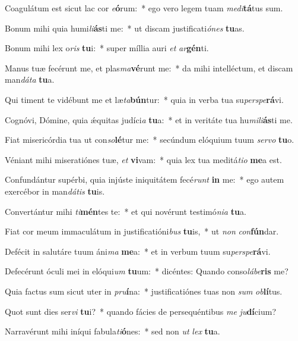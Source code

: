 \item Coagulátum est sicut lac cor \textit{e}\textbf{ó}rum:~* ego vero legem tuam \textit{me}\textit{di}\textbf{tá}tus sum.
\item Bonum mihi quia humi\textit{li}\textbf{ás}ti me:~* ut discam justificati\textit{ó}\textit{nes} \textbf{tu}as.
\item Bonum mihi lex o\textit{ris} \textbf{tu}i:~* super míllia auri \textit{et} \textit{ar}\textbf{gén}ti.
\item Manus tuæ fecérunt me, et plas\textit{ma}\textbf{vé}runt me:~* da mihi intelléctum, et discam man\textit{dá}\textit{ta} \textbf{tu}a.
\item Qui timent te vidébunt me et læ\textit{ta}\textbf{bún}tur:~* quia in verba tua su\textit{per}\textit{spe}\textbf{rá}vi.
\item Cognóvi, Dómine, quia ǽquitas judíci\textit{a} \textbf{tu}a:~* et in veritáte tua hu\textit{mi}\textit{li}\textbf{ás}ti me.
\item Fiat misericórdia tua ut con\textit{so}\textbf{lé}tur me:~* secúndum elóquium tuum \textit{ser}\textit{vo} \textbf{tu}o.
\item Véniant mihi miseratiónes tuæ, \textit{et} \textbf{vi}vam:~* quia lex tua meditá\textit{ti}\textit{o} \textbf{me}a est.
\item Confundántur supérbi, quia injúste iniquitátem fecé\textit{runt} \textbf{in} me:~* ego autem exercébor in man\textit{dá}\textit{tis} \textbf{tu}is.
\item Convertántur mihi \textit{ti}\textbf{mén}tes te:~* et qui novérunt testimó\textit{ni}\textit{a} \textbf{tu}a.
\item Fiat cor meum immaculátum in justificatióni\textit{bus} \textbf{tu}is,~* ut \textit{non} \textit{con}\textbf{fún}dar.
\item Defécit in salutáre tuum áni\textit{ma} \textbf{me}a:~* et in verbum tuum su\textit{per}\textit{spe}\textbf{rá}vi.
\item Defecérunt óculi mei in elóqui\textit{um} \textbf{tu}um:~* dicéntes: Quando conso\textit{lá}\textit{be}\textbf{ris} me?
\item Quia factus sum sicut uter in \textit{pru}\textbf{í}na:~* justificatiónes tuas non \textit{sum} \textit{ob}\textbf{lí}tus.
\item Quot sunt dies ser\textit{vi} \textbf{tu}i?~* quando fácies de persequéntibus \textit{me} \textit{ju}\textbf{dí}cium?
\item Narravérunt mihi iníqui fabula\textit{ti}\textbf{ó}nes:~* sed non \textit{ut} \textit{lex} \textbf{tu}a.
